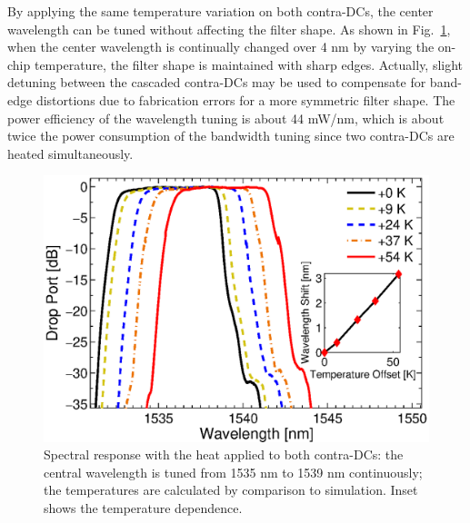\documentclass[osajnl,twocolumn,showpacs,superscriptaddress,10pt]{revtex4-1}
\begin{document}
By applying the same temperature variation on both contra-DCs, the center wavelength can be tuned without affecting the filter shape.
As shown in Fig.~\ref{fig:wavTune}, when the center wavelength is continually changed over 4 nm by varying the on-chip temperature, the filter shape is maintained with sharp edges. Actually, slight detuning between the cascaded contra-DCs may be used to compensate for band-edge distortions due to fabrication errors for a more symmetric filter shape. 
The power efficiency of the wavelength tuning is about 44 mW/nm, which is about twice the power consumption of the bandwidth tuning since two contra-DCs are heated simultaneously.
\begin{figure}[htbp]
\centering
\includegraphics[width=.99\columnwidth]{data/Central2}
\caption{Spectral response with the heat applied to both contra-DCs: the central wavelength is tuned from 1535 nm to 1539 nm continuously; the temperatures are calculated by comparison to simulation. Inset shows the temperature dependence.}
\label{fig:wavTune}
\end{figure} 



\end{document}
